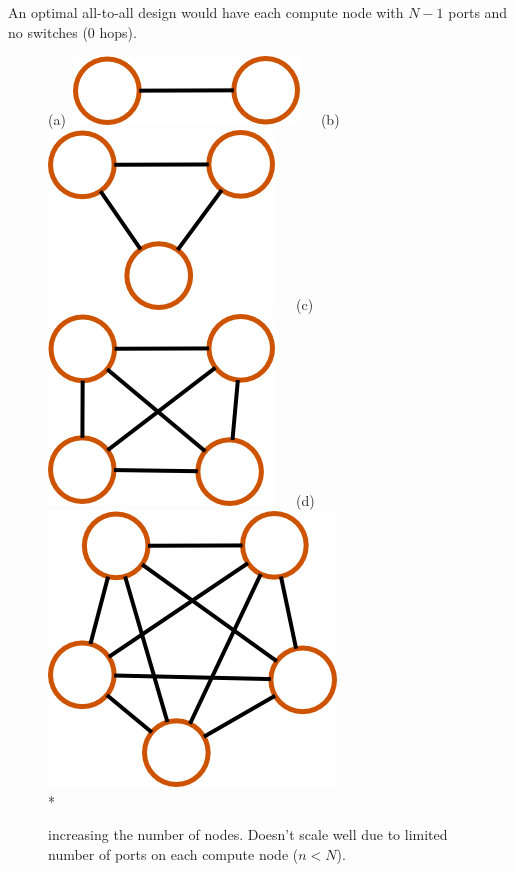 \documentclass[pdftex]{article}
\begin{document}
An optimal all-to-all design would have each compute node with $N-1$ ports and no switches (0 hops).
\begin{figure}[h!]
\begin{center}
(a)\ \includegraphics[scale=0.2]{pictures/N2_n1_M0_mNA}\ \ \ 
(b)\includegraphics[scale=0.2]{pictures/N3_n1_M0_mNA}\ \ \ 
(c)\ \includegraphics[scale=0.2]{pictures/N4_n1_M0_mNA}\ \ \ 
(d)\includegraphics[scale=0.2]{pictures/N5_n1_M0_mNA}\\*
\caption{increasing the number of nodes. Doesn't scale well due to limited number of ports on each compute node ($n<N$).}
\end{center}
\end{figure}
\end{document}
